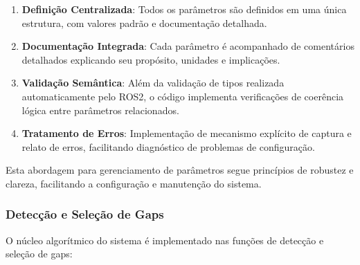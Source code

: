 \begin{enumerate}
    \item \textbf{Definição Centralizada}: Todos os parâmetros são definidos em uma única estrutura, com valores padrão e documentação detalhada.

    \item \textbf{Documentação Integrada}: Cada parâmetro é acompanhado de comentários detalhados explicando seu propósito, unidades e implicações.

    \item \textbf{Validação Semântica}: Além da validação de tipos realizada automaticamente pelo ROS2, o código implementa verificações de coerência lógica entre parâmetros relacionados.

    \item \textbf{Tratamento de Erros}: Implementação de mecanismo explícito de captura e relato de erros, facilitando diagnóstico de problemas de configuração.
\end{enumerate}

Esta abordagem para gerenciamento de parâmetros segue princípios de robustez e
clareza, facilitando a configuração e manutenção do sistema.

\subsubsection{Detecção e Seleção de Gaps}

O núcleo algorítmico do sistema é implementado nas funções de detecção e
seleção de gaps:

